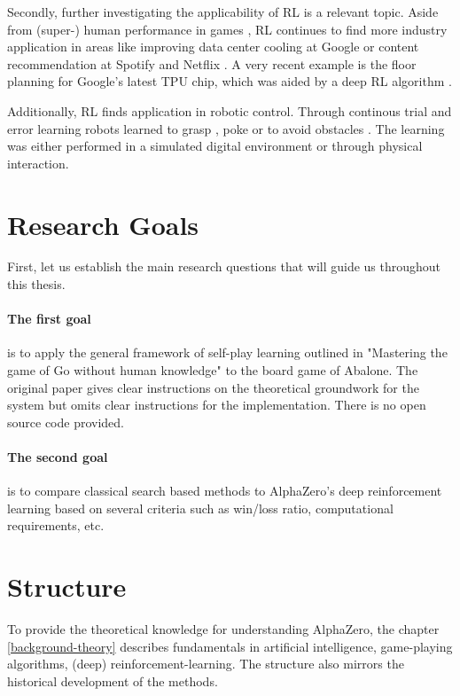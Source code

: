 Secondly, further investigating the applicability of RL is a relevant topic. Aside from (super-) human performance in games \cite{mnih_human-level_2015, berner_dota_2019,vinyals_grandmaster_2019}, RL continues to find more industry application in areas like improving data center cooling at Google \cite{gamble_safety-first_2018} or content recommendation at Spotify \cite{jebara_for_2020} and Netflix \cite{siddiqi_ml_2019}. A very recent example is the floor planning for Google's latest TPU chip, which was aided by a deep RL algorithm \cite{mirhoseini_graph_2021}.

Additionally, RL finds application in robotic control. Through continous trial and error learning robots learned to grasp \cite{pinto_supersizing_2016,zeng_learning_2018}, poke \cite{agrawal_learning_nodate} or to avoid obstacles \cite{kahn_uncertainty-aware_2017}. The learning was either performed in a simulated digital environment or through physical interaction.

\section{Research Goals}
First, let us establish the main research questions that will guide us throughout this thesis.

\paragraph{The first goal} is to apply the general framework of self-play learning outlined in "Mastering the game of Go without human knowledge" to the board game of Abalone. \cite{silver_mastering_2017} The original paper gives clear instructions on the theoretical groundwork for the system but omits clear instructions for the implementation. There is no open source code provided.

\paragraph{The second goal} is to compare classical search based methods to AlphaZero's deep reinforcement learning based on several criteria such as win/loss ratio, computational requirements, etc.

\section{Structure}
To provide the theoretical knowledge for understanding AlphaZero, the chapter \ref{background-theory} describes fundamentals in artificial intelligence, game-playing algorithms, (deep) reinforcement-learning. The structure also mirrors the historical development of the methods.

